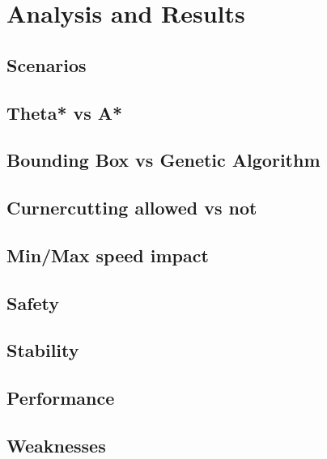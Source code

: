 \section{Analysis and Results}
\label{section:analysis}

\subsection{Scenarios}
\subsection{Theta* vs A*}
\subsection{Bounding Box vs Genetic Algorithm}
\subsection{Curnercutting allowed vs not}
\subsection{Min/Max speed impact}
\subsection{Safety}
\subsection{Stability}
\subsection{Performance}
\subsection{Weaknesses}